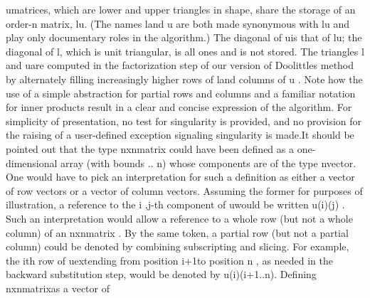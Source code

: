 \tyxffmxmono[]u\tyxffmxendmono[] matrices, which are lower and upper
triangles in shape, share the storage of an order-\tyxffmxmono[]n%
\tyxffmxendmono[] matrix, \tyxffmxmono[]lu\tyxffmxendmono[]. (The
names \tyxffmxmono[]l\tyxffmxendmono[] and \tyxffmxmono[]u%
\tyxffmxendmono[] are both made synonymous with \tyxffmxmono[]lu%
\tyxffmxendmono[] and play only documentary roles in the algorithm.)
The diagonal of \tyxffmxmono[]u\tyxffmxendmono[] is that of %
\tyxffmxmono[]lu\tyxffmxendmono[]; the diagonal of %
\tyxffmxmono[]l\tyxffmxendmono[], which is unit triangular, is all
ones and is not stored. The triangles \tyxffmxmono[]l%
\tyxffmxendmono[] and \tyxffmxmono[]u\tyxffmxendmono[] are computed
in the factorization step of our version of Doolittle\rsquo[]s method
by alternately filling increasingly higher rows of %
\tyxffmxmono[]l\tyxffmxendmono[] and columns of \tyxffmxmono[]u%
\tyxffmxendmono[]. Note how the use of a simple abstraction for partial
rows and columns and a
\TyPbrkNewp[]
 familiar notation for inner products result in a clear and concise
expression of the algorithm. For simplicity of presentation, no test
for singularity is provided, and no provision for the raising of a
user-defined exception signaling singularity is made.\Endpara[]
\Para[]It should be pointed out that the type \tyxffmxmono[]nxn\Symuns[]matrix%
\tyxffmxendmono[] could have been defined as a one-dimensional array
(with bounds \tyxinterwordxsp[]..%
\tyxinterwordxsp[]n\tyxffmxendmono[]) whose components are of the
type \tyxffmxmono[]n\Symuns[]vector\tyxffmxendmono[]. One would have
to pick an interpretation for such a definition as either a vector
of row vectors or a vector of column vectors. Assuming the former
for purposes of illustration, a reference to the \tyxffmxmono[]i%
\tyxffmxendmono[],\tyxffmxmono[]j\tyxffmxendmono[]-th component of
\tyxffmxmono[]u\tyxffmxendmono[] would be written \tyxffmxmono[]u(i)(j)%
\tyxffmxendmono[]. Such an interpretation would allow a reference
to a whole row (but not a whole column) of an \tyxffmxmono[]nxn\Symuns[]matrix%
\tyxffmxendmono[]. By the same token, a partial row (but not a partial
column) could be denoted by combining subscripting and slicing. For
example, the \tyxffmxmono[]i\tyxffmxendmono[]th row of %
\tyxffmxmono[]u\tyxffmxendmono[] extending from position %
\tyxffmxmono[]i+1\tyxffmxendmono[] to position \tyxffmxmono[]n%
\tyxffmxendmono[], as needed in the backward substitution step, would
be denoted by \tyxffmxmono[]u(i)(i+1..n)\tyxffmxendmono[]. Defining
\tyxffmxmono[]nxn\Symuns[]matrix\tyxffmxendmono[] as a vector of %

